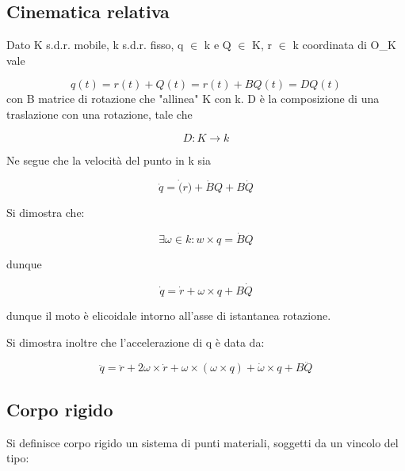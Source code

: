 \documentclass{article}
\begin{document}
        \subsection{Cinematica relativa}
        Dato K s.d.r. mobile, k s.d.r. fisso, q $\in$ k e Q $\in$ K, r $\in$ k coordinata di O\_K vale

        \begin{equation}
            q(t)=r(t)+Q(t)= r(t)+ BQ(t)= DQ(t)
        \end{equation}
        con B matrice di rotazione che "allinea" K con k. D è la composizione di una traslazione con una rotazione, tale che

        \begin{equation}
            D: K \rightarrow k
        \end{equation}

        Ne segue che la velocità del punto in k sia

        \begin{equation}
            \dot{q}= \dot(r)+\dot{B}Q+ B\dot{Q}
        \end{equation}

        Si dimostra che:

        \begin{equation}
            \exists \omega \in k : w \times q= \dot{B}Q
        \end{equation}

        dunque

        \begin{equation}
            \dot{q}= \dot{r}+\omega \times q+ B\dot{Q}
        \end{equation}

        dunque il moto è elicoidale intorno all'asse di istantanea rotazione.

        Si dimostra inoltre che l'accelerazione di q è data da:

        \begin{equation}
            \ddot{q}= \ddot{r}+2\omega \times \dot{r}+ \omega \times (\omega \times q)+ \dot{\omega} \times q+ B\ddot{Q}
        \end{equation}

        \subsection{Corpo rigido}
        Si definisce corpo rigido un sistema di punti materiali, soggetti da un vincolo del tipo:
\end{document}
